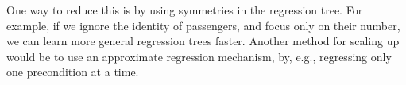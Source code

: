 \documentclass[letterpaper]{article}
\theoremstyle{definition}
\begin{document}
One way to reduce this is by using symmetries in the regression tree. For example, if we ignore the identity of passengers, and focus only on their number, we can learn more general regression trees faster. Another method for scaling up would be to use an approximate regression mechanism, by, e.g., regressing only one precondition at a time.








\end{document}

